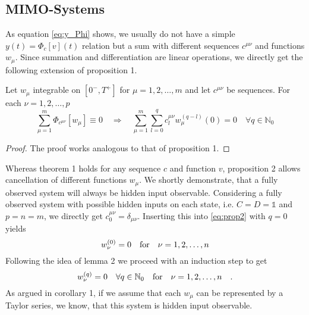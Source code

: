 \subsection{MIMO-Systems}
As equation \eqref{eq:y_Phi} shows, we usually do not have a simple $y(t)=\Phi_c[v](t)$ 
relation but a sum with different sequences $c^{\mu\nu}$ and functions $w_\mu$. Since 
summation and differentiation are linear operations, we directly get the following 
extension of proposition 1.
\begin{proposition}{}{}
	Let $w_\mu$ integrable on $[0^-,T^+]$ for $\mu=1,2,\ldots , m$ and let 
	$c^{\mu\nu}$ be sequences. For each $\nu=1,2,\ldots, p$
	\begin{equation}
	\sum\limits_{\mu=1}^m \Phi_{c^{\mu\nu}}[w_\mu] \equiv 0 \quad \Rightarrow \quad 
	\sum\limits_{\mu=1}^m\sum\limits_{l=0}^q c^{\mu\nu}_l w_\mu^{(q-l)}(0) = 0 \quad 
	\forall q \in \mathbb{N}_0 \tag{$\star\star$} \label{eq:prop2}
 	\end{equation}
\end{proposition}
\begin{proof}
	The proof works analogous to that of proposition 1.
\end{proof}

Whereas theorem 1 holds for any sequence $c$ and function $v$, proposition 2 allows 
cancellation of different functions $w_\mu$. We shortly demonstrate, that a fully 
observed system will always be hidden input observable.
Considering a fully observed system with possible hidden inputs on each state, i.e. 
$C=D=\mathbb{1}$ and $p=n=m$, we directly get $c_0^{\mu\nu}=\delta_{\mu\nu}$. 
Inserting this into 
\eqref{eq:prop2} with $q=0$ yields 
\begin{equation}
w_\nu^{(0)} = 0 \quad \text{for} \quad \nu = 1,2,\ldots , n
\end{equation}
Following the idea of lemma 2 we proceed with an induction step to get
\begin{equation}
w_\nu^{(q)} = 0 \quad \forall q\in\mathbb{N}_0 \quad \text{for} \quad \nu = 1,2,\ldots , n \quad .
\end{equation}
As argued in corollary 1, if we assume that each $w_\mu$ can be represented by a 
Taylor series, we know, that this system is hidden input observable. \\

